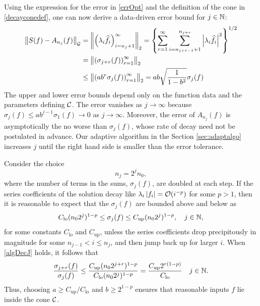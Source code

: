 \documentclass[final]{elsarticle}
\theoremstyle{definition}
\theoremstyle{remark}
\DeclareMathOperator{\up}{up}
\DeclareMathOperator{\lo}{lo}
\begin{document}
Using the expression for the error in \eqref{errOpt} and the definition of the cone in  \eqref{decayconedef}, one can now derive a data-driven error bound for $j \in \mathbb{N}$:
\begin{align}
\nonumber
\norm[\cg]{S(f)-A_{n_j}(f)} &= \norm[2]{\left(\lambda_{i} \hf_{i} \right)_{i = n_j+1}^\infty} = \left\{\sum_{r=1}^\infty \sum_{i=n_{j+r-1}+1}^{n_{j+r}}  \abs{\lambda_{i}\hf_{i} }^{2}  \right\}^{1/2}\\
\nonumber
&= \norm[2]{ \left(\sigma_{j+r}(f)\right)_{r=1}^{\infty}} \\
&\le \norm[2]{ \left(ab^r\sigma_{j}(f)\right)_{r=1}^{\infty}}
 = \displaystyle ab \sqrt{\frac{1}{1 - b^2}}\sigma_{j}(f)
 \label{algoineq}
\end{align}
The upper and lower error bounds depend only on the function data and the parameters defining $\mathcal{C}$.  The error vanishes as $j \to \infty$ because $\sigma_j(f) \le ab^{j-1} \sigma_1(f) \to 0$ as $j \to \infty$.  Moreover, the error of $A_{n_j}(f)$ is asymptotically the no worse than $\sigma_j(f)$, whose rate of decay need not be postulated in advance. Our adaptive algorithm in the Section \ref{sec:adaptalgo} increases $j$ until the right hand side is smaller than the error tolerance.

Consider the choice 
\begin{equation} \label{geonj}
n_j = 2^{j}n_0,
\end{equation}
where the number of terms in the sums, $\sigma_j(f)$, are doubled at each step.  If the series coefficients of the solution decay like $\lambda_{i} \left \lvert f_{i} \right \rvert = \operatorname{{\mathcal O}}(i^{-p})$ for some $p>1$, then it is reasonable to expect that the $\sigma_j(f)$ are bounded above and below as
\begin{equation} \label{algDecJ}
C_{\lo} (n_02^j)^{1-p} \le \sigma_j(f) \le C_{\up} (n_02^j)^{1-p}, \quad   j \in \naturals,
\end{equation}
for some constants $C_{\lo}$ and $C_{\up}$, unless the series coefficients drop precipitously in magnitude for some $n_{j-1} < i \le n_j$, and then jump back up for larger $i$.  When \eqref{algDecJ} holds, it follows that
\begin{equation*} 
\frac{\sigma_{j+r}(f)}{\sigma_j(f)} \le \frac{C_{\up} (n_02^{j+r})^{1-p}}{C_{\lo} (n_02^j)^{1-p}} = \frac{C_{\up} 2^{r(1-p)}}{C_{\lo}}\quad   j \in \naturals.
\end{equation*}
Thus, choosing $a \ge C_{\up}/C_{\lo}$ and $b \ge 2^{1-p}$ ensures that reasonable inputs $f$ lie inside the cone $\mathcal{C}$.
\end{document}
